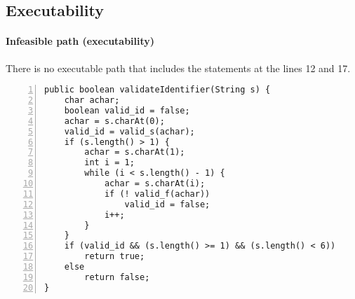 \subsection*{Executability}
\label{example:limitation-executability}


\begin{frame}[fragile]
\framesubtitle{Infeasible path (executability)}

There is no executable path that includes the statements at the lines 12 and 17.

\begin{lstlisting}[numbers=left]
public boolean validateIdentifier(String s) {
    char achar;
    boolean valid_id = false;
    achar = s.charAt(0);
    valid_id = valid_s(achar);
    if (s.length() > 1) {
        achar = s.charAt(1);
        int i = 1;
        while (i < s.length() - 1) {
            achar = s.charAt(i);
            if (! valid_f(achar))
                valid_id = false;
            i++;
        }
    }
    if (valid_id && (s.length() >= 1) && (s.length() < 6))
        return true;
    else
        return false;
}
\end{lstlisting}

\end{frame}
